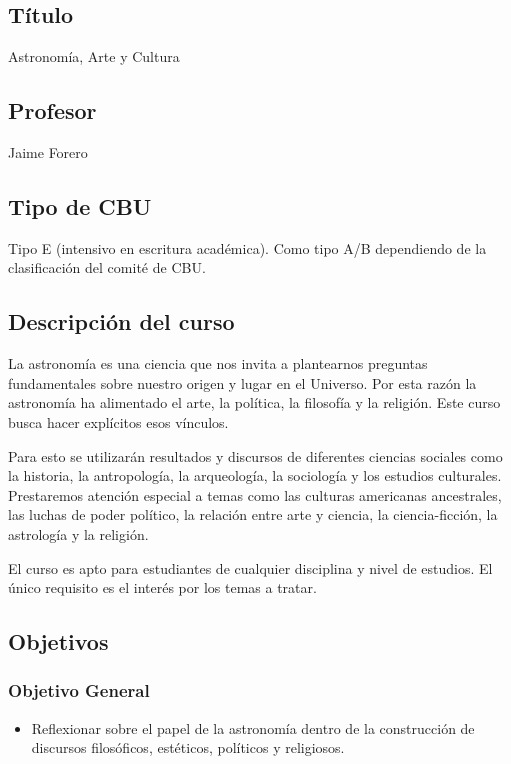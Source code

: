 \documentclass[12pt]{report}
\begin{document}
\subsection*{\bf T\'itulo}
Astronom\'ia, Arte y Cultura\\

\subsection*{\bf Profesor}
Jaime Forero\\

\subsection*{Tipo de CBU}
Tipo E (intensivo en escritura acad\'emica). 
Como tipo A/B dependiendo de la clasificaci\'on del comit\'e de CBU.  

\subsection*{Descripci\'on del curso}
La astronom\'ia es una ciencia que nos invita a plantearnos preguntas
fundamentales sobre nuestro origen y lugar en el Universo. 
Por esta raz\'on la astronom\'ia ha alimentado el
arte, la pol\'itica, la filosof\'ia y la religi\'on. Este curso busca
hacer expl\'icitos esos v\'inculos.

Para esto se utilizar\'an resultados y discursos de diferentes
ciencias sociales como la historia, la antropolog\'ia, la arqueolog\'ia, la
sociolog\'ia y los estudios culturales. Prestaremos atenci\'on
especial a temas como las culturas americanas  ancestrales, las luchas
de poder pol\'itico, la relaci\'on entre arte y ciencia, la ciencia-ficci\'on,
la astrolog\'ia y la  religi\'on.   

El curso es apto para estudiantes de cualquier disciplina y nivel de
estudios. El \'unico requisito es el inter\'es por los temas a
tratar. 
\subsection*{Objetivos}

\subsubsection*{Objetivo General}
\begin{itemize}
\item Reflexionar sobre el papel de la astronom\'ia dentro de la
  construcci\'on de discursos filos\'oficos,
  est\'eticos, pol\'iticos y religiosos. 
\end{itemize}
\end{document}
